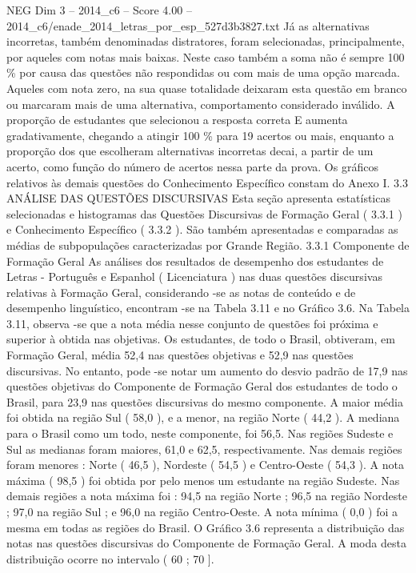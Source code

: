 \begin{textsample}{NEG Dim 3 – 2014\_c6 – Score 4.00 – 2014\_c6/enade\_2014\_letras\_por\_esp\_527d3b3827.txt}
Já as alternativas incorretas, também denominadas distratores, foram selecionadas, principalmente, por aqueles com notas mais baixas.
Neste caso também a soma não é sempre 100 \% por causa das questões não respondidas ou com mais de uma opção marcada.
Aqueles com nota zero, na sua quase totalidade deixaram esta questão em branco ou marcaram mais de uma alternativa, comportamento considerado inválido.
A proporção de estudantes que selecionou a resposta correta E aumenta gradativamente, chegando a atingir 100 \% para 19 acertos ou mais, enquanto a proporção dos que escolheram alternativas incorretas decai, a partir de um acerto, como função do número de acertos nessa parte da prova.
Os gráficos relativos às demais questões do Conhecimento Específico constam do Anexo I. 3.3 ANÁLISE DAS QUESTÕES DISCURSIVAS Esta seção apresenta estatísticas selecionadas e histogramas das Questões Discursivas de Formação Geral ( 3.3.1 ) e Conhecimento Específico ( 3.3.2 ).
São também apresentadas e comparadas as médias de subpopulações caracterizadas por Grande Região. 3.3.1 Componente de Formação Geral As análises dos resultados de desempenho dos estudantes de Letras - Português e Espanhol ( Licenciatura ) nas duas questões discursivas relativas à Formação Geral, considerando -se as notas de conteúdo e de desempenho linguístico, encontram -se na Tabela 3.11 e no Gráfico 3.6.
Na Tabela 3.11, observa -se que a nota média nesse conjunto de questões foi próxima e superior à obtida nas objetivas.
Os estudantes, de todo o Brasil, obtiveram, em Formação Geral, média 52,4 nas questões objetivas e 52,9 nas questões discursivas.
No entanto, pode -se notar um aumento do desvio padrão de 17,9 nas questões objetivas do Componente de Formação Geral dos estudantes de todo o Brasil, para 23,9 nas questões discursivas do mesmo componente.
A maior média foi obtida na região Sul ( 58,0 ), e a menor, na região Norte ( 44,2 ).
A mediana para o Brasil como um todo, neste componente, foi 56,5.
Nas regiões Sudeste e Sul as medianas foram maiores, 61,0 e 62,5, respectivamente.
Nas demais regiões foram menores : Norte ( 46,5 ), Nordeste ( 54,5 ) e Centro-Oeste ( 54,3 ).
A nota máxima ( 98,5 ) foi obtida por pelo menos um estudante na região Sudeste.
Nas demais regiões a nota máxima foi : 94,5 na região Norte ; 96,5 na região Nordeste ; 97,0 na região Sul ; e 96,0 na região Centro-Oeste.
A nota mínima ( 0,0 ) foi a mesma em todas as regiões do Brasil.
O Gráfico 3.6 representa a distribuição das notas nas questões discursivas do Componente de Formação Geral.
A moda desta distribuição ocorre no intervalo ( 60 ; 70 ].

\end{textsample}

